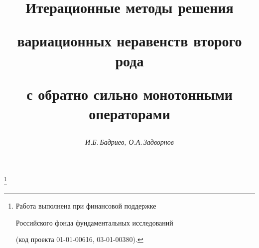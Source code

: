 




% 


\newcommand{\la}{\langle}


\newcommand{\ra}{\rangle}


\newcommand{\Argmin}{\operatornamewithlimits{Arg\ min}}


\newcommand{\tts}[1]{} 










\setcounter{page}{20}















\author{\it И.Б.\,Бадриев, О.А.\,Задворнов}




\title{Итерационные методы решения


вариационных неравенств второго рода


с обратно сильно монотонными операторами}


\thanks{Работа выполнена при финансовой поддержке 


Российского фонда фундаментальных исследований 


(код проекта 01-01-00616, 03-01-00380). }





\date{}




\pagestyle{plain} %





